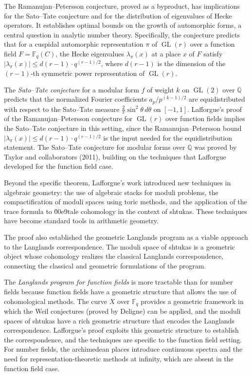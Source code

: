 The Ramanujan--Petersson conjecture, proved as a byproduct, has implications for the Sato--Tate conjecture and for the distribution of eigenvalues of Hecke operators. It establishes optimal bounds on the growth of automorphic forms, a central question in analytic number theory. Specifically, the conjecture predicts that for a cuspidal automorphic representation $\pi$ of $\operatorname{GL}(r)$ over a function field $F = \mathbb{F}_q(C)$, the Hecke eigenvalues $\lambda_\pi(x)$ at a place $x$ of $F$ satisfy $|\lambda_\pi(x)| \le d(r-1) \cdot q^{(r-1)/2}$, where $d(r-1)$ is the dimension of the $(r-1)$-th symmetric power representation of $\operatorname{GL}(r)$.

The \emph{Sato--Tate conjecture} for a modular form $f$ of weight $k$ on $\operatorname{GL}(2)$ over $\mathbb{Q}$ predicts that the normalized Fourier coefficients $a_p / p^{(k-1)/2}$ are equidistributed with respect to the Sato--Tate measure $\frac{2}{\pi} \sin^2 \theta \, d\theta$ on $[-1,1]$. Lafforgue's proof of the Ramanujan--Petersson conjecture for $\operatorname{GL}(r)$ over function fields implies the Sato--Tate conjecture in this setting, since the Ramanujan--Petersson bound $|\lambda_\pi(x)| \le d(r-1) \cdot q^{(r-1)/2}$ is the input needed for the equidistribution statement. The Sato--Tate conjecture for modular forms over $\mathbb{Q}$ was proved by Taylor and collaborators (2011), building on the techniques that Lafforgue developed for the function field case.

Beyond the specific theorem, Lafforgue's work introduced new techniques in algebraic geometry: the use of algebraic stacks for moduli problems, the compactification of moduli spaces using toric methods, and the application of the trace formula to \u00e9tale cohomology in the context of shtukas. These techniques have become standard tools in arithmetic geometry.

The proof also established the geometric Langlands program as a viable approach to the Langlands correspondence. The moduli space of shtukas is a geometric object whose cohomology realizes the classical Langlands correspondence, connecting the classical and geometric formulations of the program.

The \emph{Langlands program for function fields} is more tractable than for number fields because function fields have a geometric structure that allows the use of cohomological methods. The curve $X$ over $\mathbb{F}_q$ provides a geometric framework in which the Weil conjectures (proved by Deligne) can be applied, and the moduli spaces of shtukas have a rich geometric structure that encodes the Langlands correspondence. Lafforgue's proof exploits this geometric structure to establish the correspondence, and the techniques are specific to the function field setting. For number fields, the archimedean places introduce continuous spectra and the need for representation-theoretic methods at infinity, which are absent in the function field case.

